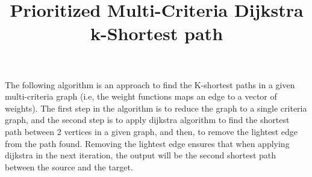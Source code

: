 \documentclass[preprint,12pt]{elsarticle}
\begin{document}
\begin{frontmatter}


\title{Prioritized Multi-Criteria Dijkstra k-Shortest path}






\address{Ben Gurion University of the Negev, Israel}





\end{frontmatter}

\linenumbers






The following algorithm is an approach to find the K-shortest paths in a given multi-criteria graph (i.e, the weight functions maps an edge to a vector of weights). The first step in the algorithm is to reduce the graph to a single criteria graph, and the second step is to apply dijkstra algorithm to find the shortest path between 2 vertices in a given graph, and then, to remove the lightest edge from the path found. Removing the lightest edge ensures that when applying dijkstra in the next iteration, the output will be the second shortest path between the source and the target. 
\end{document}
